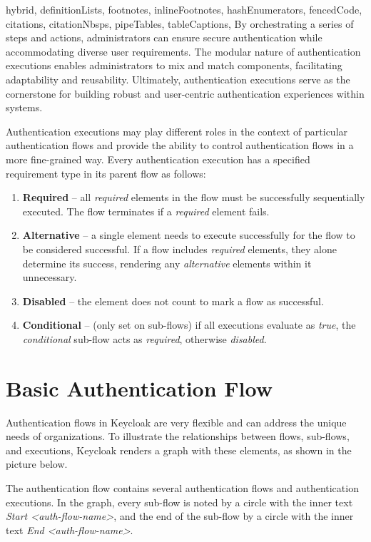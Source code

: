 \documentclass[
  digital,     %
  oneside,     %
  nosansbold,  %
  nocolorbold, %
  lof,         %
  lot,         %
]{fithesis4}
\begin{document}
\begin{markdown*}{%
  hybrid,
  definitionLists,
  footnotes,
  inlineFootnotes,
  hashEnumerators,
  fencedCode,
  citations,
  citationNbsps,
  pipeTables,
  tableCaptions,
}
By orchestrating a series of steps and actions, administrators can ensure secure authentication while accommodating diverse user requirements.
The modular nature of authentication executions enables administrators to mix and match components, facilitating adaptability and reusability.
Ultimately, authentication executions serve as the cornerstone for building robust and user-centric authentication experiences within systems.

Authentication executions may play different roles in the context of particular authentication flows and provide the ability to control authentication flows in a more fine-grained way. \cite{keycloak-auth-flows}
\newline
\newline
Every authentication execution has a specified requirement type in its parent flow as follows:

\begin{enumerate}
    \item \textbf{Required} -- all \textit{required} elements in the flow must be successfully sequentially executed. The flow terminates if a \textit{required} element fails.
    \item \textbf{Alternative} -- a single element needs to execute successfully for the flow to be considered successful. If a flow includes \textit{required} elements, they alone determine its success, rendering any \textit{alternative} elements within it unnecessary.
    \item \textbf{Disabled} -- the element does not count to mark a flow as successful.
    \item \textbf{Conditional} -- (only set on sub-flows) if all executions evaluate as \textit{true}, the \textit{conditional} sub-flow acts as \textit{required}, otherwise \textit{disabled}.
\end{enumerate}

\newpage

\section{Basic Authentication Flow}
Authentication flows in Keycloak are very flexible and can address the unique needs of organizations.
To illustrate the relationships between flows, sub-flows, and executions, Keycloak renders a graph with these elements, as shown in the picture below.

The authentication flow contains several authentication flows and authentication executions.
In the graph, every sub-flow is noted by a circle with the inner text \textit{Start <auth-flow-name>}, and the end of the sub-flow by a circle with the inner text \textit{End <auth-flow-name>}.


\end{markdown*}
\end{document}
